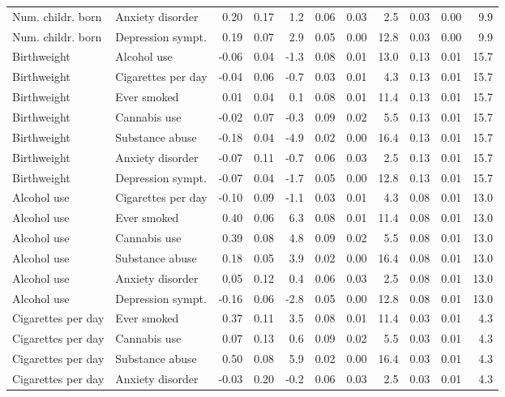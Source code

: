 {\begin{longtable}{llrrrrrrrrr}
  Num. childr. born & Anxiety disorder & 0.20 & 0.17 & 1.2 & 0.06 & 0.03 & 2.5 & 0.03 & 0.00 & 9.9 \\ 
  Num. childr. born & Depression sympt. & 0.19 & 0.07 & 2.9 & 0.05 & 0.00 & 12.8 & 0.03 & 0.00 & 9.9 \\ 
  Birthweight & Alcohol use & -0.06 & 0.04 & -1.3 & 0.08 & 0.01 & 13.0 & 0.13 & 0.01 & 15.7 \\ 
  Birthweight & Cigarettes per day & -0.04 & 0.06 & -0.7 & 0.03 & 0.01 & 4.3 & 0.13 & 0.01 & 15.7 \\ 
  Birthweight & Ever smoked & 0.01 & 0.04 & 0.1 & 0.08 & 0.01 & 11.4 & 0.13 & 0.01 & 15.7 \\ 
  Birthweight & Cannabis use & -0.02 & 0.07 & -0.3 & 0.09 & 0.02 & 5.5 & 0.13 & 0.01 & 15.7 \\ 
  Birthweight & Substance abuse & -0.18 & 0.04 & -4.9 & 0.02 & 0.00 & 16.4 & 0.13 & 0.01 & 15.7 \\ 
  Birthweight & Anxiety disorder & -0.07 & 0.11 & -0.7 & 0.06 & 0.03 & 2.5 & 0.13 & 0.01 & 15.7 \\ 
  Birthweight & Depression sympt. & -0.07 & 0.04 & -1.7 & 0.05 & 0.00 & 12.8 & 0.13 & 0.01 & 15.7 \\ 
  Alcohol use & Cigarettes per day & -0.10 & 0.09 & -1.1 & 0.03 & 0.01 & 4.3 & 0.08 & 0.01 & 13.0 \\ 
  Alcohol use & Ever smoked & 0.40 & 0.06 & 6.3 & 0.08 & 0.01 & 11.4 & 0.08 & 0.01 & 13.0 \\ 
  Alcohol use & Cannabis use & 0.39 & 0.08 & 4.8 & 0.09 & 0.02 & 5.5 & 0.08 & 0.01 & 13.0 \\ 
  Alcohol use & Substance abuse & 0.18 & 0.05 & 3.9 & 0.02 & 0.00 & 16.4 & 0.08 & 0.01 & 13.0 \\ 
  Alcohol use & Anxiety disorder & 0.05 & 0.12 & 0.4 & 0.06 & 0.03 & 2.5 & 0.08 & 0.01 & 13.0 \\ 
  Alcohol use & Depression sympt. & -0.16 & 0.06 & -2.8 & 0.05 & 0.00 & 12.8 & 0.08 & 0.01 & 13.0 \\ 
  Cigarettes per day & Ever smoked & 0.37 & 0.11 & 3.5 & 0.08 & 0.01 & 11.4 & 0.03 & 0.01 & 4.3 \\ 
  Cigarettes per day & Cannabis use & 0.07 & 0.13 & 0.6 & 0.09 & 0.02 & 5.5 & 0.03 & 0.01 & 4.3 \\ 
  Cigarettes per day & Substance abuse & 0.50 & 0.08 & 5.9 & 0.02 & 0.00 & 16.4 & 0.03 & 0.01 & 4.3 \\ 
  Cigarettes per day & Anxiety disorder & -0.03 & 0.20 & -0.2 & 0.06 & 0.03 & 2.5 & 0.03 & 0.01 & 4.3 \\ 

\end{longtable}}
